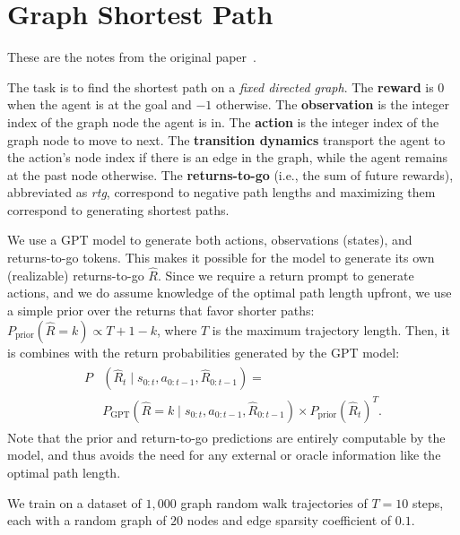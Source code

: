 \section{Graph Shortest Path}
\label{sec:background}

\noindent These are the notes from the original paper~\cite{chen2021decision}.

The task is to find the shortest path on a \textit{fixed directed graph}. The 
\textbf{reward} is $0$ when the agent is at the goal and $-1$ otherwise. The 
\textbf{observation} is the integer index of the graph node the agent is in. The
\textbf{action} is the integer index of the graph node to move to next. The 
\textbf{transition dynamics} transport the agent to the action's node index if
there is an edge in the graph, while the agent remains at the past node
otherwise. The \textbf{returns-to-go} (i.e., the sum of future rewards),
abbreviated as \textit{rtg}, correspond to negative path lengths and maximizing 
them correspond to generating shortest paths.

We use a GPT model to generate both actions, observations (states), and 
returns-to-go tokens. This makes it possible for the model to generate its own 
(realizable) returns-to-go $\widehat{R}$. Since we require a return prompt to 
generate actions, and we do assume knowledge of the optimal path length upfront,
we use a simple prior over the returns that favor shorter paths: $P_{\text{prior}}(\widehat{R}=k) \propto T + 1 -k$, where $T$ is the maximum trajectory 
length. Then, it is combines with the return probabilities generated by the GPT 
model: 
%
\begin{align}
  \begin{split}
  P&(\widehat{R}_t \mid s_{0:t}, a_{0:t-1}, \widehat{R}_{0:t-1}) =  \\
&P_{\text{GPT}}(\widehat{R}=k \mid s_{0:t}, a_{0:t-1}, \widehat{R}_{0:t-1})
\times P_{\text{prior}}(\widehat{R}_t)^T.
  \end{split}
\end{align}
%
Note that the prior and return-to-go predictions are entirely computable by the 
model, and thus avoids the need for any external or oracle information like the optimal path length.

We train on a dataset of $1,000$ graph random walk trajectories of $T = 10$ 
steps, each with a random graph of $20$ nodes and edge sparsity coefficient of 
$0.1$.